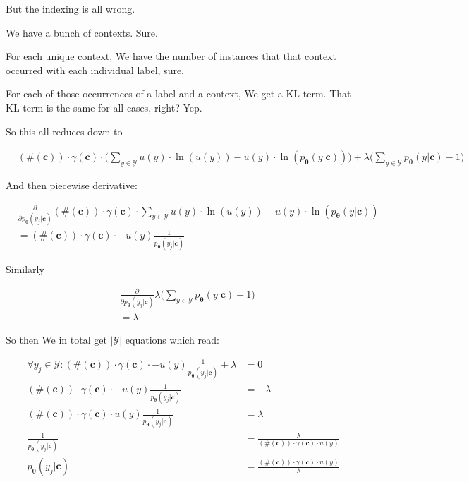 \documentclass{article}
\newcommand{\vtheta}{\boldsymbol{\theta}}
\newcommand{\model}{p_{\vtheta}}
\newcommand{\context}{\boldsymbol{c}}
\begin{document}
			But the indexing is all wrong.
			
			We have a bunch of contexts. Sure.
			
			For each unique context, We have the number of instances that that context occurred with each individual label, sure.
			
			For each of those occurrences of a label and a context, We get a KL term. That KL term is the same for all cases, right? Yep.
			
			So this all reduces down to
			
			\begin{align}
				&(\#(\context))\cdot \gamma(\context)\cdot \bigg( \sum_{y\in\mathcal{Y}} u(y)\cdot\ln(u(y)) - u(y)\cdot\ln(\model(y|\context))\bigg) + \lambda\bigg(\sum_{y\in\mathcal{Y}} \model(y|\context) -1 \bigg)
			\end{align}
			
			And then piecewise derivative:
			
			\begin{align}
				& \frac{\partial}{\partial \model(y_j|\context)} (\#(\context))\cdot \gamma(\context)\cdot  \sum_{y\in\mathcal{Y}} u(y)\cdot\ln(u(y)) - u(y)\cdot\ln(\model(y|\context))\\
				&=  (\#(\context))\cdot \gamma(\context)\cdot    - u(y)\frac{1}{\model(y_j|\context)}
			\end{align}
			
			Similarly
			
			\begin{align}
				&\frac{\partial}{\partial \model(y_j|\context)} \lambda\bigg(\sum_{y\in\mathcal{Y}} \model(y|\context) -1 \bigg)\\
				&=\lambda
			\end{align}
			
			So then We in total get $|\mathcal{Y}|$ equations which read:
			
			\begin{align}
				 \forall y_j\in\mathcal{Y}:(\#(\context))\cdot \gamma(\context)\cdot    - u(y)\frac{1}{\model(y_j|\context)} + \lambda &= 0\\
				(\#(\context))\cdot \gamma(\context)\cdot - u(y)\frac{1}{\model(y_j|\context)}  &= -\lambda\\
				(\#(\context))\cdot \gamma(\context)\cdot u(y)\frac{1}{\model(y_j|\context)}  &= \lambda\\
				\frac{1}{\model(y_j|\context)}  &= \frac{\lambda}{(\#(\context))\cdot \gamma(\context)\cdot u(y)}\\
				\model(y_j|\context)  &= \frac{(\#(\context))\cdot \gamma(\context)\cdot u(y)}{\lambda}
			\end{align}
			
\end{document}
